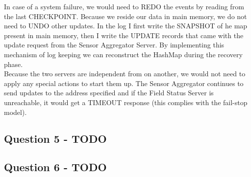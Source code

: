 \documentclass{article}      %
\begin{document}
In case of a system failure, we would need to REDO the events by reading from the last CHECKPOINT. Because we reside our data in main memory, we do not need to UNDO other updates. In the log I first write the SNAPSHOT of he map present in main memory, then I write the UPDATE records that came with the update request from the Sensor Aggregator Server. By implementing this mechanism of log keeping we can reconstruct the HashMap during the recovery phase. \\

Because the two servers are independent from on another, we would not need to apply any special actions to start them up. The Sensor Aggregator continues to send updates to the address specified and if the Field Status Server is unreachable, it would get a TIMEOUT response (this complies with the fail-stop model). \\

\subsection* {Question 5 - TODO}
\subsection* {Question 6 - TODO}
\end{document}
